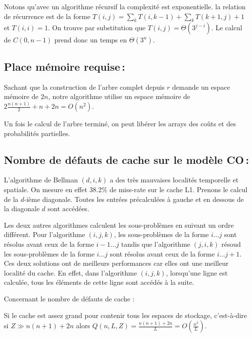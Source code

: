 \documentclass[a4paper, 10pt, french]{article}
\begin{document}
Notons qu'avec un algorithme récursif la complexité est exponentielle. la relation de récurrence est de la forme $T(i, j) = \sum_k T(i, k - 1) + \sum_k T(k + 1, j) + 1$ et $T(i, i) = 1$. On trouve par substitution que $T(i, j) = \Theta(3^{j - i})$. Le calcul de $C(0, n - 1)$ prend donc un temps en $\Theta(3^n)$.
\subsection{Place mémoire requise\,: }
Sachant que la construction de l'arbre complet depuis $r$ demande un espace mémoire de $2n$, notre algorithme utilise un espace mémoire de $2\frac{n(n+1)}{2} + n + 2n = O(n^2)$. \par\leavevmode\par

Un fois le calcul de l'arbre terminé, on peut libérer les arrays des coûts et des probabilités partielles.

\subsection{Nombre de défauts de cache sur le modèle CO\,: }

L'algorithme de Bellman $(d, i, k)$ a des très mauvaises localités temporelle et spatiale. On mesure en effet 38.2\% de miss-rate sur le cache L1. Prenons le calcul de la $d$-ième diagonale. Toutes les entrées précalculées à gauche et en dessous de la diagonale $d$ sont accédées.

Les deux autres algorithmes calculent les sous-problèmes en suivant un ordre différent. Pour l'algorithme $(i, j, k)$, les sous-problèmes de la forme $i \ldots j$ sont résolus avant ceux de la forme $i - 1 \ldots j$ tandis que l'algorithme $(j, i, k)$ résoud les sous-problèmes de la forme $i \ldots j$ sont résolus avant ceux de la forme $i \ldots j + 1$. Ces deux solutions ont de meilleurs performances car elles ont une meilleur localité du cache. En effet, dans l'algorithme $(i, j, k)$, lorsqu'une ligne est calculée, tous les éléments de cette ligne sont accédés à la suite.


Concernant le nombre de défauts de cache :

Si le cache est assez grand pour contenir tous les espaces de stockage, c'est-à-dire si $Z \gg n(n+1) + 2n$ alors $Q(n, L, Z) = \frac{n(n+1) + 2n}{L} = O(\frac{n^2}{L})$.
\end{document}
